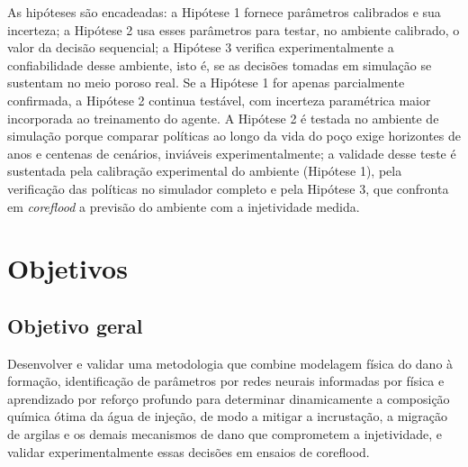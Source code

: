 \documentclass[10pt,a4paper]{article}
\newcommand{\itemedital}[1]{}
\begin{document}
As hipóteses são encadeadas: a Hipótese 1 fornece parâmetros calibrados e sua incerteza;
a Hipótese 2 usa esses parâmetros para testar, no ambiente calibrado, o valor da decisão
sequencial; a Hipótese 3 verifica experimentalmente a confiabilidade desse ambiente, isto é,
se as decisões tomadas em simulação se sustentam no meio poroso real. Se a
Hipótese 1 for apenas parcialmente confirmada, a Hipótese 2 continua testável, com incerteza
paramétrica maior incorporada ao treinamento do agente. A Hipótese 2 é testada no ambiente de
simulação porque comparar políticas ao longo da vida do poço exige horizontes de anos e centenas
de cenários, inviáveis experimentalmente; a validade desse teste é sustentada pela calibração
experimental do ambiente (Hipótese 1), pela verificação das políticas no simulador completo e pela
Hipótese 3, que confronta em \textit{coreflood} a previsão do ambiente com a injetividade medida.

\section{Objetivos}\itemedital{2.16 XI}

\subsection{Objetivo geral}
Desenvolver e validar uma metodologia que combine modelagem física do dano à formação,
identificação de parâmetros por redes neurais informadas por física e aprendizado por
reforço profundo para determinar dinamicamente a composição química ótima da água de injeção, de modo a mitigar a incrustação, a
migração de argilas e os demais mecanismos de dano que comprometem a injetividade, e validar
experimentalmente essas decisões em ensaios de coreflood.
\end{document}
